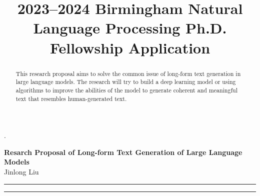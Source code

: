 \documentclass[10pt]{article}
\author{}
\title{2023--2024 Birmingham Natural Language Processing Ph.D. Fellowship Application}
\begin{document}
\renewcommand{\thesection}{\Roman{section}}.
	
	\begin{center}
		{\Large \textbf{Resarch Proposal of Long-form Text Generation of Large Language Models}}\\
		\vspace{1em}
		{\large Jinlong Liu}\\
		\vspace{1em}
	\end{center}

	\begin{center}
		\rule{150mm}{0.2mm}
	\end{center}	
	
	\begin{abstract}
	
		This research proposal aims to solve the common issue of long-form text generation in large language models. The research will try to build a deep learning model or using algorithms to improve the abilities of the model to generate coherent and meaningful text that resembles human-generated text.
	\end{abstract}

	\begin{center}
		\rule{150mm}{0.2mm}
	\end{center}	

	\vspace{5mm}
\end{document}
